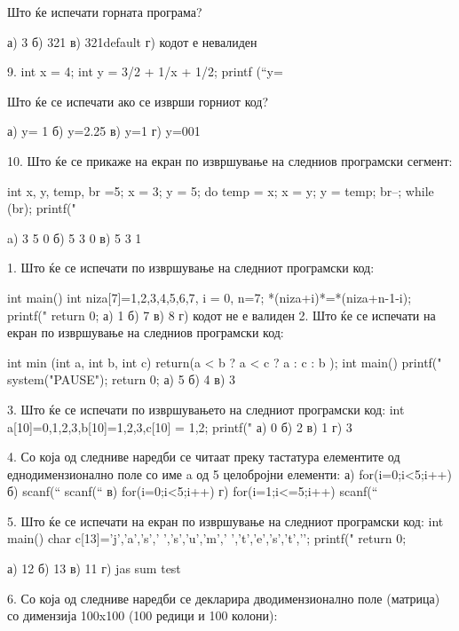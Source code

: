 {{{{{{{{      Што ќе испечати горната програма?

       а) 3      
б) 321      
в) 321default      
г) кодот е невалиден


9. int x = 4;
int y = 3/2 + 1/x + 1/2;
printf (“y=%

Што ќе се испечати ако се изврши горниот код? 

а) y=   1       б) y=2.25       в) y=1          г) y=001

10. Што ќе се прикаже на екран по извршување на следниов програмски сегмент: 

int x, y, temp, br =5;
x = 3; y = 5;
    do {
            temp = x; x = y; y = temp;
        br--;       
        }
    while (br);
    printf("%

a) 3 5 0            б) 5 3 0            в) 5 3 1    

1. Што ќе се испечати по извршување на следниот програмски код:

int main()
{   
    int niza[7]={1,2,3,4,5,6,7}, i = 0, n=7;
    *(niza+i)*=*(niza+n-1-i);
    printf("%
    return 0;
}
а) 1        б) 7        в) 8        г) кодот не е валиден
2. Што ќе се испечати на екран по извршување на следниов програмски код:

int min (int a, int b, int c)
{ return(a < b ? a < c ? a : c : b ); }
int main()
{    
    printf("%
    system("PAUSE");
    return 0;
}
а) 5                б) 4            в) 3

3. Што ќе се испечати по извршувањето на следниот програмски код:
int a[10]={0,1,2,3},b[10]={1,2,3},c[10] = {1,2};
printf("%
а) 0                    б) 2
в) 1                    г)  3

4. Со која од следниве наредби се читаат преку тастатура елементите од еднодимензионално поле со име a од 5 целобројни елементи:
а) for(i=0;i<5;i++)             б) scanf(“%
scanf(“%
в) for(i=0;i<5;i++)             г) for(i=1;i<=5;i++)    
    scanf(“%

5. Што ќе се испечати на екран по извршување на следниот програмски код:
        int main()
        {   char c[13]={'j','a','s',’ ’,’s’,’u’,’m’,’ ’,'t','e','s','t','\0'}; 
        printf("%
return 0;       }

а) 12                   б) 13
в) 11                   г) jas sum test

6. Со која од следниве наредби се декларира дводимензионално поле (матрица) со димензија 100x100 (100 редици и 100 колони):

}}}}}}}}
